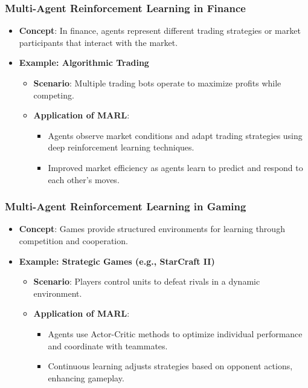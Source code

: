 \documentclass[aspectratio=169]{beamer}
\begin{document}
\begin{frame}[fragile]
    \frametitle{Multi-Agent Reinforcement Learning in Finance}
    \begin{itemize}
        \item \textbf{Concept}: In finance, agents represent different trading strategies or market participants that interact with the market.
        \item \textbf{Example: Algorithmic Trading}
        \begin{itemize}
            \item \textbf{Scenario}: Multiple trading bots operate to maximize profits while competing.
            \item \textbf{Application of MARL}:
            \begin{itemize}
                \item Agents observe market conditions and adapt trading strategies using deep reinforcement learning techniques.
                \item Improved market efficiency as agents learn to predict and respond to each other's moves.
            \end{itemize}
        \end{itemize}
    \end{itemize}
\end{frame}

\begin{frame}[fragile]
    \frametitle{Multi-Agent Reinforcement Learning in Gaming}
    \begin{itemize}
        \item \textbf{Concept}: Games provide structured environments for learning through competition and cooperation.
        \item \textbf{Example: Strategic Games (e.g., StarCraft II)}
        \begin{itemize}
            \item \textbf{Scenario}: Players control units to defeat rivals in a dynamic environment.
            \item \textbf{Application of MARL}:
            \begin{itemize}
                \item Agents use Actor-Critic methods to optimize individual performance and coordinate with teammates.
                \item Continuous learning adjusts strategies based on opponent actions, enhancing gameplay.
            \end{itemize}
        \end{itemize}
    \end{itemize}
\end{frame}
\end{document}
